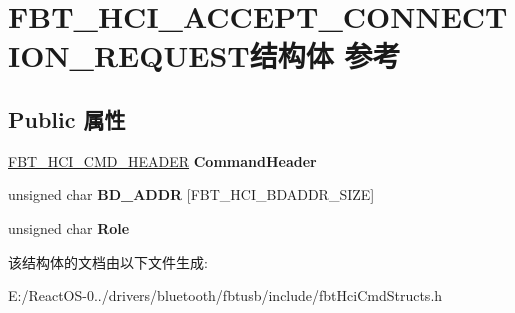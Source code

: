 \hypertarget{struct_f_b_t___h_c_i___a_c_c_e_p_t___c_o_n_n_e_c_t_i_o_n___r_e_q_u_e_s_t}{}\section{F\+B\+T\+\_\+\+H\+C\+I\+\_\+\+A\+C\+C\+E\+P\+T\+\_\+\+C\+O\+N\+N\+E\+C\+T\+I\+O\+N\+\_\+\+R\+E\+Q\+U\+E\+S\+T结构体 参考}
\label{struct_f_b_t___h_c_i___a_c_c_e_p_t___c_o_n_n_e_c_t_i_o_n___r_e_q_u_e_s_t}
\subsection*{Public 属性}
\begin{DoxyCompactItemize}
\item 
\mbox{\label{struct_f_b_t___h_c_i___a_c_c_e_p_t___c_o_n_n_e_c_t_i_o_n___r_e_q_u_e_s_t_a3c7df898db279a2e55879f805d421722}} 
\hyperlink{struct_f_b_t___h_c_i___c_m_d___h_e_a_d_e_r}{F\+B\+T\+\_\+\+H\+C\+I\+\_\+\+C\+M\+D\+\_\+\+H\+E\+A\+D\+ER} {\bfseries Command\+Header}
\item 
\mbox{\label{struct_f_b_t___h_c_i___a_c_c_e_p_t___c_o_n_n_e_c_t_i_o_n___r_e_q_u_e_s_t_a4a847c0842f8c352b9f1b92e01e1e6f9}} 
unsigned char {\bfseries B\+D\+\_\+\+A\+D\+DR} \mbox{[}F\+B\+T\+\_\+\+H\+C\+I\+\_\+\+B\+D\+A\+D\+D\+R\+\_\+\+S\+I\+ZE\mbox{]}
\item 
\mbox{\label{struct_f_b_t___h_c_i___a_c_c_e_p_t___c_o_n_n_e_c_t_i_o_n___r_e_q_u_e_s_t_a1dbaeeaa347d4d6f9a964a4b1f7eb1fe}} 
unsigned char {\bfseries Role}
\end{DoxyCompactItemize}


该结构体的文档由以下文件生成\+:\begin{DoxyCompactItemize}
\item 
E\+:/\+React\+O\+S-\/0../drivers/bluetooth/fbtusb/include/fbt\+Hci\+Cmd\+Structs.\+h\end{DoxyCompactItemize}
